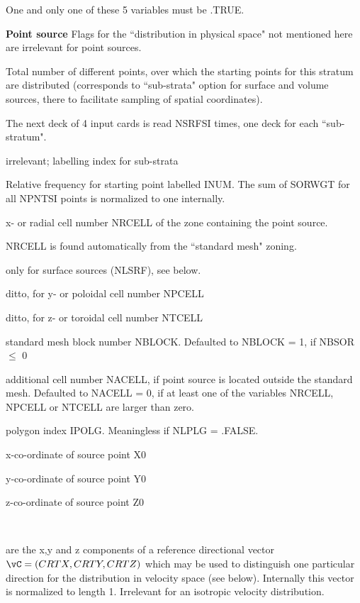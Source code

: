 One and only one of these 5 variables must be .TRUE.

\medskip

\textcolor[rgb]{0.00,0.00,1.00}{{\bf Point source}
}
Flags for the ``distribution in physical space" not mentioned here
are irrelevant for point sources.
\begin{list}{ }{}
\item[{\bf NSRFSI (=NPNTSI) }]
Total number of different points, over which the starting points
for this stratum are distributed (corresponds to ``sub-strata" option for surface and
volume sources,
there to facilitate sampling of spatial coordinates).
\end{list}
The next deck of 4 input cards is read NSRFSI times, one deck for each ``sub-stratum".
\begin{list}{ }{}
\item[{\bf INUM }]
irrelevant; labelling index for sub-strata
\item[{\bf SORWGT }]
Relative frequency for starting point labelled INUM.
The sum of SORWGT for all
NPNTSI points is normalized to one internally.
\item[{\bf NRSOR }]
\begin{list}{ }{}
\item[{$>$ 0 }]
x- or radial
cell number NRCELL of the zone containing the point source.
\item[{= 0 }]
NRCELL is found automatically from the ``standard mesh" zoning.
\item[{$<$ 0 }]
only for surface sources (NLSRF), see below.
\end{list}
\item[{\bf NPSOR }]
ditto, for y- or poloidal cell number NPCELL
\item[{\bf NTSOR }]
ditto, for z- or toroidal cell number NTCELL
\item[{\bf NBSOR }]
standard mesh block number NBLOCK. Defaulted to NBLOCK = 1,
if NBSOR $\le$ 0
\item[{\bf NASOR }]
additional cell number NACELL, if point source is located
outside the standard mesh. Defaulted to NACELL = 0, if at least one
of the variables NRCELL, NPCELL or NTCELL are larger than zero.
\item[{\bf NISOR }]
polygon index IPOLG. Meaningless if NLPLG = .FALSE.
\item[{\bf SORAD1 }]
x-co-ordinate of source point X0
\item[{\bf SORAD2 }]
y-co-ordinate of source point Y0
\item[{\bf SORAD3 }]
z-co-ordinate of source point Z0
\item[{\bf SORAD4, SORAD5, SORAD6 }] ~

are the x,y and z components of a reference directional
vector $\vC = (CRTX,CRTY,CRTZ)$
which may be used to distinguish one particular direction for the
distribution in velocity space (see below). Internally this vector
is normalized to length 1. Irrelevant for an isotropic velocity
distribution.
\end{list}

